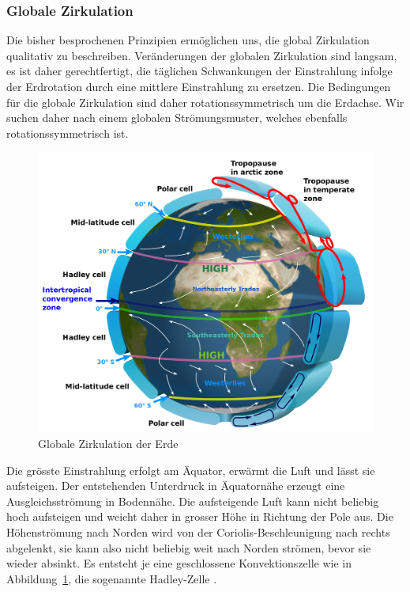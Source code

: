 \subsubsection{Globale Zirkulation}
Die bisher besprochenen Prinzipien ermöglichen uns, die
global Zirkulation qualitativ zu beschreiben.
Veränderungen der globalen Zirkulation sind langsam,
es ist daher gerechtfertigt, die täglichen Schwankungen der
Einstrahlung infolge der Erdrotation durch eine mittlere
Einstrahlung zu ersetzen.
Die Bedingungen für die globale Zirkulation sind daher rotationssymmetrisch
um die Erdachse.
Wir suchen daher nach einem globalen Strömungsmuster, welches ebenfalls
rotationssymmetrisch ist.

\begin{figure}
\centering
\includegraphics[width=\hsize]{chapters/1/Earth_Global_Circulation_-_en.png}
\caption{Globale Zirkulation der Erde
\label{skript:globalezirkulation}}
\end{figure}

Die grösste Einstrahlung erfolgt am Äquator, erwärmt die Luft und
lässt sie aufsteigen.
Der entstehenden Unterdruck in Äquatornähe erzeugt eine 
Ausgleichsströmung in Bodennähe.
Die aufsteigende Luft kann nicht beliebig hoch aufsteigen und weicht
daher in grosser Höhe in Richtung der Pole aus.
Die Höhenströmung nach Norden wird von der Coriolis-Beschleunigung nach
rechts abgelenkt, sie kann also nicht beliebig weit nach Norden
strömen, bevor sie wieder absinkt.
Es entsteht je eine geschlossene Konvektionszelle wie in
Abbildung~\ref{skript:globalezirkulation}, die sogenannte
Hadley-Zelle \cite{skript:hadley}.

